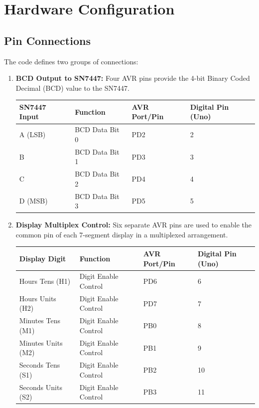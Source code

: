 \documentclass{article}
\theoremstyle{remark}
\begin{document}
\section{Hardware Configuration}
\subsection{Pin Connections}
The code defines two groups of connections:
\begin{enumerate}[label=\alph*)]
    \item \textbf{BCD Output to SN7447:}  
    Four AVR pins provide the 4-bit Binary Coded Decimal (BCD) value to the SN7447.
    \begin{center}
    \begin{tabular}{|l|l|l|l|}
    \hline
    \textbf{SN7447 Input} & \textbf{Function} & \textbf{AVR Port/Pin} & \textbf{Digital Pin (Uno)} \\ \hline
    A (LSB) & BCD Data Bit 0 & PD2 & 2 \\ \hline
    B       & BCD Data Bit 1 & PD3 & 3 \\ \hline
    C       & BCD Data Bit 2 & PD4 & 4 \\ \hline
    D (MSB) & BCD Data Bit 3 & PD5 & 5 \\ \hline
    \end{tabular}
    \end{center}

    \item \textbf{Display Multiplex Control:}  
    Six separate AVR pins are used to enable the common pin of each 7-segment display in a multiplexed arrangement.
    \begin{center}
    \begin{tabular}{|l|l|l|l|}
    \hline
    \textbf{Display Digit} & \textbf{Function}       & \textbf{AVR Port/Pin} & \textbf{Digital Pin (Uno)} \\ \hline
    Hours Tens (H1)        & Digit Enable Control   & PD6 & 6 \\ \hline
    Hours Units (H2)       & Digit Enable Control   & PD7 & 7 \\ \hline
    Minutes Tens (M1)      & Digit Enable Control   & PB0 & 8 \\ \hline
    Minutes Units (M2)     & Digit Enable Control   & PB1 & 9 \\ \hline
    Seconds Tens (S1)      & Digit Enable Control   & PB2 & 10 \\ \hline
    Seconds Units (S2)     & Digit Enable Control   & PB3 & 11 \\ \hline
    \end{tabular}
    \end{center}
\end{enumerate}
\end{document}
